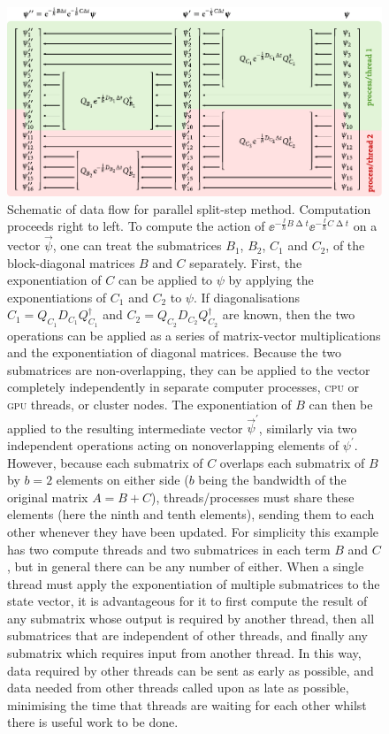 \begin{figure}[t]
    \centerfloat
    \includegraphics[width=\textwidth]{figures/numerics/parallel_split_step.pdf}
    \caption{Schematic of data flow for parallel split-step method. Computation proceeds right to left. To compute the action of $\ee^{-\frac\ii\hbar B\upDelta t}\ee^{-\frac\ii\hbar C\upDelta t}$ on a vector $\vec\psi$, one can treat the submatrices $B_1$, $B_2$, $C_1$ and $C_2$, of the block-diagonal matrices $B$ and $C$ separately. First, the exponentiation of $C$ can be applied to $\psi$ by applying the exponentiations of $C_1$ and $C_2$ to $\psi$. If diagonalisations $C_1 = Q_{C_1} D_{C_1} Q^\dagger_{C_1}$ and $C_2 = Q_{C_2} D_{C_2} Q^\dagger_{C_2}$ are known, then the two operations can be applied as a series of matrix-vector multiplications and the exponentiation of diagonal matrices. Because the two submatrices are non-overlapping, they can be applied to the vector completely independently in separate computer processes, \textsc{cpu} or \textsc{gpu} threads, or cluster nodes. The exponentiation of $B$ can then be applied to the resulting intermediate vector $\vec\psi^\prime$, similarly via two independent operations acting on nonoverlapping elements of $\psi^\prime$. However, because each submatrix of $C$ overlaps each submatrix of $B$ by $b=2$ elements on either side ($b$ being the bandwidth of the original matrix $A=B+C$), threads/processes must share these elements (here the ninth and tenth elements), sending them to each other whenever they have been updated. For simplicity this example has two compute threads and two submatrices in each term $B$ and $C$, but in general there can be any number of either. When a single thread must apply the exponentiation of multiple submatrices to the state vector, it is advantageous for it to first compute the result of any submatrix whose output is required by another thread, then all submatrices that are independent of other threads, and finally any submatrix which requires input from another thread. In this way, data required by other threads can be sent as early as possible, and data needed from other threads called upon as late as possible, minimising the time that threads are waiting for each other whilst there is useful work to be done.}
    \label{fig:parallel_split_step}
\end{figure}

